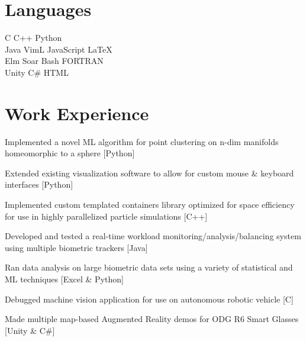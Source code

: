 \documentclass[letterpaper]{headers} %
\begin{document}
\begin{minipage}[t]{0.33\textwidth}
\section{Languages}
	C \textbullet{} C++ \textbullet{} Python \\
	Java \textbullet{} VimL \textbullet{} JavaScript \textbullet{} \LaTeX\ \\
	Elm \textbullet{} Soar \textbullet{} Bash \textbullet{} FORTRAN \textbullet{} \\
	Unity \textbullet{} C\# \textbullet{} HTML\\
\sectionspace
\end{minipage}
\hfill
%
\begin{minipage}[t]{0.66\textwidth}

\section{Work Experience}
	\vspace{\topsep}
	\begin{tightitemize}
		\item Implemented a novel ML algorithm for point clustering on n-dim manifolds homeomorphic to a sphere [Python]
		\item Extended existing visualization software to allow for custom mouse \& keyboard interfaces [Python]
		\item Implemented custom templated containers library optimized for space efficiency for use in highly parallelized particle simulations [C++]
	\end{tightitemize}

	\sectionspace

	\begin{tightitemize}
		\item Developed and tested a real-time workload monitoring/analysis/balancing system using multiple biometric trackers [Java]
		\item Ran data analysis on large biometric data sets using a variety of statistical and ML techniques [Excel \& Python]
		\item Debugged machine vision application for use on autonomous robotic vehicle [C]
		\item Made multiple map-based Augmented Reality demos for ODG R6 Smart Glasses [Unity \& C\#]
	\end{tightitemize}
	

\end{minipage}
\end{document}
